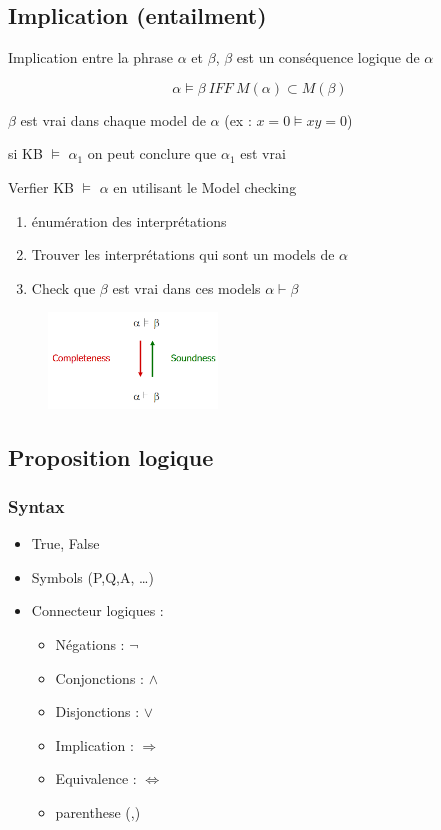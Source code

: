 \documentclass[12pt]{article}
\begin{document}
	\subsection{Implication (entailment)}
		Implication entre la phrase $\alpha$ et $\beta$, $\beta$ est un conséquence logique de $\alpha$
		
		\begin{equation}
		\alpha \models \beta \ IFF \ M(\alpha) \subset M(\beta)
		\end{equation}
		
		$\beta$ est vrai dans chaque model de $\alpha$ (ex : $x=0 \models xy=0$)
		
		si KB $\models$ $\alpha_1$ on peut conclure que $\alpha_1$ est vrai
		
		Verfier KB $\models$ $\alpha$ en utilisant le Model checking
		
		\begin{enumerate}
			\item énumération des interprétations
			\item Trouver les interprétations qui sont un models de $\alpha$
			\item Check que $\beta$ est vrai dans ces models $\alpha \vdash \beta$
		\end{enumerate}
		
		\begin{figure}[htp]	
			\centering
			\includegraphics[width=0.4\textwidth]{img/KBA2.png}
		\end{figure}
		
	\subsection{Proposition logique}
		\subsubsection{Syntax}
			\begin{itemize}
				\item True, False
				\item Symbols (P,Q,A, \dots)
				\item Connecteur logiques :
				\begin{itemize}
					\item Négations : $\neg$
					\item Conjonctions : $\wedge$
					\item Disjonctions : $\vee$
					\item Implication : $\Rightarrow$
					\item Equivalence : $\Leftrightarrow$
					\item parenthese (,)
				\end{itemize}
			\end{itemize}
			
\end{document}
